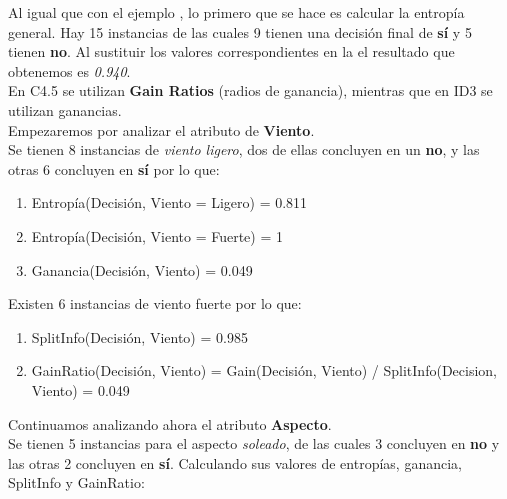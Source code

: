 \begin{UClist}
	\UCli Al igual que con el ejemplo , lo primero que se hace es calcular la entropía general. Hay 15 instancias de las cuales 9 tienen una decisión final de \textbf{sí} y 5 tienen \textbf{no}. Al sustituir los valores correspondientes en la  el resultado que obtenemos es \emph{0.940}.\\

	\UCli En C4.5 se utilizan \textbf{Gain Ratios} (radios de ganancia), mientras que en ID3 se utilizan ganancias.\\

	\UCli Empezaremos por analizar el atributo de \textbf{Viento}.\\

	Se tienen 8 instancias de \emph{viento ligero}, dos de ellas concluyen en un \textbf{no}, y las otras 6 concluyen en \textbf{sí} por lo que:\\

	\begin{enumerate}
		\item Entropía(Decisión, Viento = Ligero) = 0.811\\
		\item Entropía(Decisión, Viento = Fuerte) = 1\\
		\item Ganancia(Decisión, Viento) = 0.049\\
	\end{enumerate}

	Existen 6 instancias de viento fuerte por lo que:

	\begin{enumerate}
		\item SplitInfo(Decisión, Viento) = 0.985\\
		\item GainRatio(Decisión, Viento) = Gain(Decisión, Viento) / SplitInfo(Decision, Viento) = 0.049\\
	\end{enumerate}

	\UCli Continuamos analizando ahora el atributo \textbf{Aspecto}.\\

	Se tienen 5 instancias para el aspecto \emph{soleado}, de las cuales 3 concluyen en \textbf{no} y las otras 2 concluyen en \textbf{sí}. Calculando sus valores de entropías, ganancia, SplitInfo y GainRatio:\\


\end{UClist}
